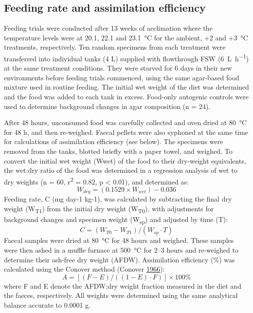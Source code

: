 \documentclass[a4paper,10pt, oneside]{memoir}
\begin{document}
\hypertarget{feeding-rate-and-assimilation-efficiency}{%
\subsection{Feeding rate and assimilation efficiency}\label{feeding-rate-and-assimilation-efficiency}}

Feeding trials were conducted after 13 weeks of acclimation where the temperature levels were at 20.1, 22.1 and \SI{23.1}{\celsius} for the ambient, +2 and +\SI{3}{\celsius} treatments, respectively.
Ten random specimens from each treatment were transferred into individual tanks (4 L) supplied with flowthrough FSW (\SI{6}{L.h^{-1}}) at the same treatment conditions.
They were starved for 6 days in their new environments before feeding trials commenced, using the same agar-based food mixture used in routine feeding.
The initial wet weight of the diet was determined and the food was added to each tank in excess.
Food-only autogenic controls were used to determine background changes in agar composition (n = 24).

After 48 hours, unconsumed food was carefully collected and oven dried at \SI{80}{\celsius} for 48 h, and then re-weighed.
Faecal pellets were also syphoned at the same time for calculations of assimilation efficiency (see below).
The specimens were removed from the tanks, blotted briefly with a paper towel, and weighed.
To convert the initial wet weight (Wwet) of the food to their dry-weight equivalents, the wet:dry ratio of the food was determined in a regression analysis of wet to dry weights (n = 60, r\textsuperscript{2} = 0.82, p \textless{} 0.01), and determined as:
\[W_{dry}=(0.1529 \times W_{wet})-0.036\]
Feeding rate, C (mg day-1 kg-1), was calculated by subtracting the final dry weight (W\textsubscript{T1}) from the initial dry weight (W\textsubscript{T0}), with adjustments for background changes and specimen weight (W\textsubscript{sp}) and adjusted by time (T):
\[C=(W_{T0}-W_{T1})/(W_{sp} \cdot T)\]
Faecal samples were dried at \SI{80}{\celsius} for 48 hours and weighed. These samples were then ashed in a muffle furnace at \SI{500}{\celsius} for 2--3 hours and re-weighed to determine their ash-free dry weight (AFDW).
Assimilation efficiency (\%) was calculated using the Conover method (Conover \protect\hyperlink{ref-Conover1966}{1966}):
\[A=[(F-E)/((1-E) \cdot F)] \times 100\%\]
where F and E denote the AFDW:dry weight fraction measured in the diet and the faeces, respectively.
All weights were determined using the same analytical balance accurate to 0.0001 g.
\end{document}
